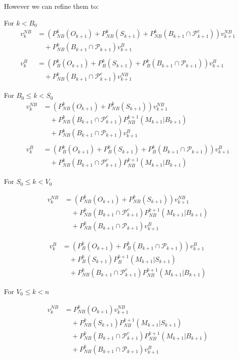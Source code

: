 \documentclass[a4paper,11pt]{article}
\begin{document}
However we can refine them to:

For $k < B_0$
\begin{align*}
v_k^{NB} &= (P_{NB}^k(O_{k+1}) + P_{NB}^k(S_{k+1})+P_{NB}^k(B_{k+1} \cap \mathcal{P}_{k+1}^c)) v_{k+1}^{NB} \\
      &\quad + P_{NB}^k(B_{k+1} \cap \mathcal{P}_{k+1})v_{k+1}^{B}\\\\
v_k^{B} &= (P_{B}^k(O_{k+1}) + P_{B}^k(S_{k+1})+P_{B}^k(B_{k+1} \cap \mathcal{P}_{k+1})) v_{k+1}^{B} \\
      &\quad + P_{NB}^k(B_{k+1} \cap \mathcal{P}_{k+1}^c)v_{k+1}^{NB}
\end{align*}

For $B_0 \le k < S_0$
\begin{align*}
v_k^{NB} &= (P_{NB}^k(O_{k+1}) + P_{NB}^k(S_{k+1})) v_{k+1}^{NB} \\
      &\quad + P_{NB}^k(B_{k+1} \cap \mathcal{P}_{k+1}^c)P_{NB}^{k+1}(M_{k+1}|B_{k+1})\\
      &\quad + P_{NB}^k(B_{k+1} \cap \mathcal{P}_{k+1})v_{k+1}^{B}\\\\
v_k^{B} &= (P_{B}^k(O_{k+1}) + P_{B}^k(S_{k+1})+P_{B}^k(B_{k+1} \cap \mathcal{P}_{k+1})) v_{k+1}^{B} \\
      &\quad + P_{NB}^k(B_{k+1} \cap \mathcal{P}_{k+1}^c)P_{NB}^{k+1}(M_{k+1}|B_{k+1})
\end{align*}

For $S_0 \le k < V_0$

\begin{align*}
v_k^{NB} &= (P_{NB}^k(O_{k+1}) + P_{NB}^k(S_{k+1})) v_{k+1}^{NB} \\
      &\quad + P_{NB}^k(B_{k+1} \cap \mathcal{P}_{k+1}^c)P_{NB}^{k+1}(M_{k+1}|B_{k+1})\\
      &\quad + P_{NB}^k(B_{k+1} \cap \mathcal{P}_{k+1})v_{k+1}^{B}
\end{align*}


\begin{align*}
v_k^{B} &= (P_{B}^k(O_{k+1}) +P_{B}^k(B_{k+1}\cap \mathcal{P}_{k+1})) v_{k+1}^{B} \\
        &\quad +P_{B}^k(S_{k+1})P_{B}^{k+1}(M_{k+1}|S_{k+1})\\
      &\quad + P_{NB}^k(B_{k+1} \cap \mathcal{P}_{k+1}^c)P_{NB}^{k+1}(M_{k+1}|B_{k+1})
\end{align*}

For $V_0 \le k < n$

\begin{align*}
v_k^{NB} &= P_{NB}^k(O_{k+1}) v_{k+1}^{NB} \\
    &\quad  + P_{NB}^k(S_{k+1})P_{NB}^{k+1}(M_{k+1}|S_{k+1})\\  
      &\quad + P_{NB}^k(B_{k+1} \cap \mathcal{P}_{k+1}^c)P_{NB}^{k+1}(M_{k+1}|B_{k+1})\\
      &\quad + P_{NB}^k(B_{k+1} \cap \mathcal{P}_{k+1})v_{k+1}^{B}
\end{align*}
\end{document}
